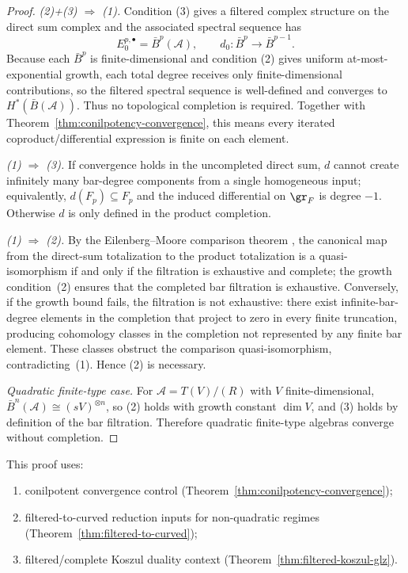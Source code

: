 \begin{proof}
\emph{(2)+(3) $\Rightarrow$ (1).}
Condition (3) gives a filtered complex structure on the direct sum complex and
the associated spectral sequence has
\[
E_0^{p,\bullet}=\bar{B}^p(\mathcal{A}), \qquad d_0:\bar{B}^p\to\bar{B}^{p-1}.
\]
Because each $\bar{B}^p$ is finite-dimensional and condition (2) gives uniform
at-most-exponential growth, each total degree receives only finite-dimensional
contributions, so the filtered spectral sequence is well-defined and converges
to $H^*(\bar{B}(\mathcal{A}))$. Thus no topological completion is required.
Together with Theorem~\ref{thm:conilpotency-convergence}, this means every
iterated coproduct/differential expression is finite on each element.

\emph{(1) $\Rightarrow$ (3).}
If convergence holds in the uncompleted direct sum, $d$ cannot create infinitely
many bar-degree components from a single homogeneous input; equivalently,
$d(F_p)\subseteq F_p$ and the induced differential on $\gr_F$ is degree $-1$.
Otherwise $d$ is only defined in the product completion.

\emph{(1) $\Rightarrow$ (2).}
By the Eilenberg--Moore comparison theorem \cite[Theorem~7.14]{Weibel94}, the canonical map from the direct-sum totalization to the product totalization is a quasi-isomorphism if and only if the filtration is exhaustive and complete; the growth condition~(2) ensures that the completed bar filtration is exhaustive.  Conversely, if the growth bound fails, the filtration is not exhaustive: there exist infinite-bar-degree elements in the completion that project to zero in every finite truncation, producing cohomology classes in the completion not represented by any finite bar element.  These classes obstruct the comparison quasi-isomorphism, contradicting~(1).  Hence (2) is necessary.

\emph{Quadratic finite-type case.}
For $\mathcal{A}=T(V)/(R)$ with $V$ finite-dimensional,
$\bar{B}^n(\mathcal{A})\cong (sV)^{\otimes n}$, so (2) holds with growth constant
$\dim V$, and (3) holds by definition of the bar filtration. Therefore quadratic
finite-type algebras converge without completion.
\end{proof}

\begin{remark}[Dependencies]
This proof uses:
\begin{enumerate}[label=(D\arabic*)]
\item conilpotent convergence control (Theorem~\ref{thm:conilpotency-convergence});
\item filtered-to-curved reduction inputs for non-quadratic regimes
(Theorem~\ref{thm:filtered-to-curved});
\item filtered/complete Koszul duality context (Theorem~\ref{thm:filtered-koszul-glz}).
\end{enumerate}
\end{remark}

